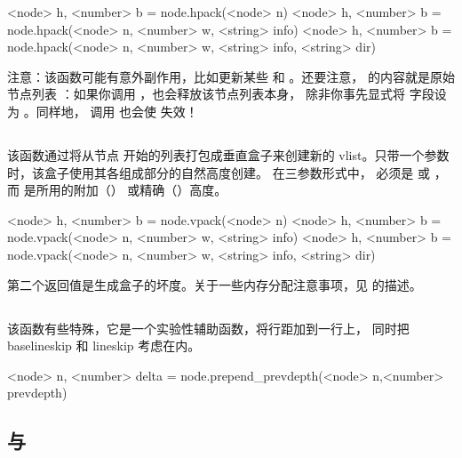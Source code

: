 \begin{typing}
<node> h, <number> b =
    node.hpack(<node> n)
<node> h, <number> b =
    node.hpack(<node> n, <number> w, <string> info)
<node> h, <number> b =
    node.hpack(<node> n, <number> w, <string> info, <string> dir)
\end{typing}

注意：该函数可能有意外副作用，比如更新某些  和
\type {\inserts}。还要注意， 的内容就是原始节点列表
：如果你调用 ，也会释放该节点列表本身，
除非你事先显式将  字段设为 。同样地，
调用  也会使  失效！

\subsection{}


该函数通过将从节点  开始的列表打包成垂直盒子来创建新的
vlist。只带一个参数时，该盒子使用其各组成部分的自然高度创建。
在三参数形式中， 必须是  或
，而  是所用的附加（）
或精确（）高度。

\begin{typing}
<node> h, <number> b =
    node.vpack(<node> n)
<node> h, <number> b =
    node.vpack(<node> n, <number> w, <string> info)
<node> h, <number> b =
    node.vpack(<node> n, <number> w, <string> info, <string> dir)
\end{typing}

第二个返回值是生成盒子的坏度。关于一些内存分配注意事项，见
 的描述。

\subsection{}


该函数有些特殊，它是一个实验性辅助函数，将行距加到一行上，
同时把 baselineskip 和 lineskip 考虑在内。

\begin{typing}
<node> n, <number> delta =
    node.prepend_prevdepth(<node> n,<number> prevdepth)
\end{typing}

\subsection{ 与 }

